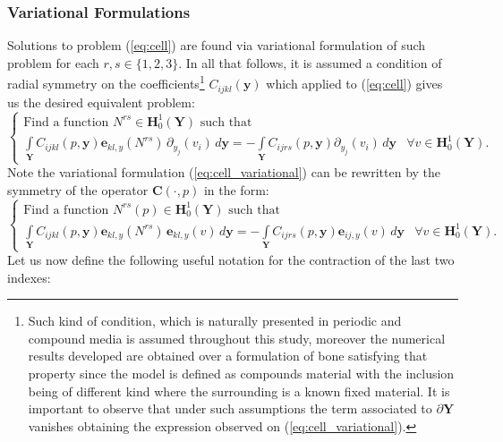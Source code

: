 \subsubsection{Variational Formulations}
Solutions to problem (\ref{eq:cell}) are found via variational formulation of such problem for each $r,s \in \{1,2,3\}$. In all that follows, it is assumed a condition of radial symmetry on the coefficients\footnote{Such kind of condition, which is naturally presented in periodic and compound media is assumed throughout this study, moreover the numerical results developed are obtained over a formulation of bone satisfying that property since the model is defined as compounds material with the inclusion being of different kind where the surrounding is a known fixed material. It is important to observe that under such assumptions the term associated to $\partial \mathbf{Y}$ vanishes obtaining the expression observed on (\ref{eq:cell_variational}).} $C_{ijkl}(\mathbf{y})$ which applied to (\ref{eq:cell}) gives us the desired equivalent problem:
\begin{equation}
    \label{eq:cell_variational}
    \left \{
    \begin{array}{cc}
        \text{Find a function } N^{rs} \in \mathbf{H}^1_{0}(\mathbf{Y}) \text{ such that } & \quad \\
        \int\limits_{\mathbf{Y}} C_{ijkl}(p,\mathbf{y})\mathbf{e}_{kl,y} (N^{rs}) \, \partial_{y_j}(v_i)\,d\mathbf{y} = -\int\limits_{\mathbf{Y}} C_{ijrs}(p, \mathbf{y}) \partial_{y_j}(v_i)\,d\mathbf{y} &  \forall v \in \mathbf{H}^1_{0}(\mathbf{Y}).
    \end{array}
    \right.
\end{equation}
Note the variational formulation (\ref{eq:cell_variational}) can be rewritten by the symmetry of the operator $\mathbf{C}(\cdot,p)$ in the form:
\begin{equation}
    \label{eq:cell_symmetric}
    \left \{
    \begin{array}{cc}
        \text{Find a function } N^{rs}(p) \in \mathbf{H}^1_{0}(\mathbf{Y}) \text{ such that } & \quad\\
        \int\limits_{\mathbf{Y}} C_{ijkl}(p,\mathbf{y})\mathbf{e}_{kl,y} (N^{rs})\, \mathbf{e}_{kl,y}(v)\,d\mathbf{y} = -\int\limits_{\mathbf{Y}} C_{ijrs}(p,\mathbf{y}) \mathbf{e}_{ij,y}(v)\,d\mathbf{y} &\forall v \in \mathbf{H}^1_{0}(\mathbf{Y}).
    \end{array}
    \right.
\end{equation}
Let us now define the following useful notation for the contraction of the last two indexes:

